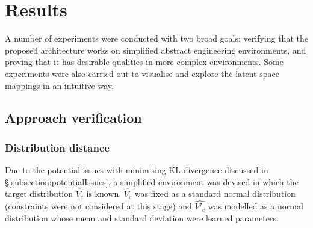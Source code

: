 \documentclass[../../main.tex]{subfiles}
\begin{document}
\chapter{Results} \label{chapter:results}

A number of experiments were conducted with two broad goals: verifying that the proposed architecture works on simplified abstract engineering environments, and proving that it has desirable qualities in more complex environments.
Some experiments were also carried out to visualise and explore the latent space mappings in an intuitive way.

\section{Approach verification} \label{section:approachVerification}

\subsection{Distribution distance} \label{subsection:distributionDistance}

Due to the potential issues with minimising KL-divergence discussed in \S\ref{subsection:potentialIssues}, a simplified environment was devised in which the target distribution $\hat{V_c}$ is known.
$\hat{V_c}$ was fixed as a standard normal distribution (constraints were not considered at this stage) and $\hat{V'_c}$ was modelled as a normal distribution whose mean and standard deviation were learned parameters.
\end{document}
